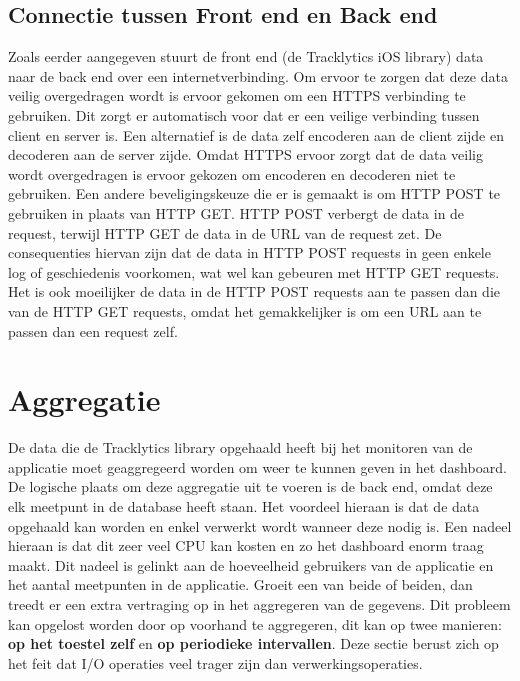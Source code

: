 \subsection{Connectie tussen Front end en Back end}
Zoals eerder aangegeven stuurt de front end (de Tracklytics iOS library) data naar de back end over een internetverbinding. Om ervoor te zorgen dat deze data veilig overgedragen wordt is ervoor gekomen om een HTTPS verbinding te gebruiken. Dit zorgt er automatisch voor dat er een veilige verbinding tussen client en server is. Een alternatief is de data zelf encoderen aan de client zijde en decoderen aan de server zijde. Omdat HTTPS ervoor zorgt dat de data veilig wordt overgedragen is ervoor gekozen om encoderen en decoderen niet te gebruiken.
Een andere beveligingskeuze die er is gemaakt is om HTTP POST te gebruiken in plaats van HTTP GET. HTTP POST verbergt de data in de request, terwijl HTTP GET de data in de URL van de request zet. De consequenties hiervan zijn dat de data in HTTP POST requests in geen enkele log of geschiedenis voorkomen, wat wel kan gebeuren met HTTP GET requests. Het is ook moeilijker de data in de HTTP POST requests aan te passen dan die van de HTTP GET requests, omdat het gemakkelijker is om een URL aan te passen dan een request zelf.\\

\section{Aggregatie}
De data die de Tracklytics library opgehaald heeft bij het monitoren van de applicatie moet geaggregeerd worden om weer te kunnen geven in het dashboard. De logische plaats om deze aggregatie uit te voeren is de back end, omdat deze elk meetpunt in de database heeft staan. Het voordeel hieraan is dat de data opgehaald kan worden en enkel verwerkt wordt wanneer deze nodig is. Een nadeel hieraan is dat dit zeer veel CPU kan kosten en zo het dashboard enorm traag maakt. Dit nadeel is gelinkt aan de hoeveelheid gebruikers van de applicatie en het aantal meetpunten in de applicatie. Groeit een van beide of beiden, dan treedt er een extra vertraging op in het aggregeren van de gegevens. Dit probleem kan opgelost worden door op voorhand te aggregeren, dit kan op twee manieren: \textbf{op het toestel zelf} en \textbf{op periodieke intervallen}. Deze sectie berust zich op het feit dat I/O operaties veel trager zijn dan verwerkingsoperaties.\\


